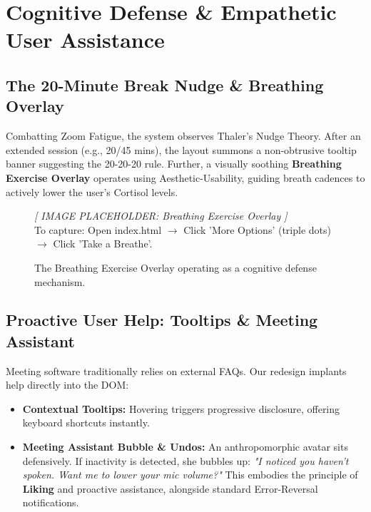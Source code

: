 \documentclass[12pt,a4paper]{article}
\begin{document}
\section{Cognitive Defense \& Empathetic User Assistance}

\subsection{The 20-Minute Break Nudge \& Breathing Overlay}
Combatting Zoom Fatigue, the system observes Thaler's Nudge Theory. After an extended session (e.g., 20/45 mins), the layout summons a non-obtrusive tooltip banner suggesting the 20-20-20 rule. Further, a visually soothing \textbf{Breathing Exercise Overlay} operates using Aesthetic-Usability, guiding breath cadences to actively lower the user's Cortisol levels.

\begin{figure}[H]
    \centering
    \begin{tcolorbox}[colback=gray!10,colframe=gray!50,arc=4mm,height=7cm,valign=center,halign=center]
        \large\textit{[ IMAGE PLACEHOLDER: Breathing Exercise Overlay ]}\\[0.5cm]
        \small To capture: Open index.html $\rightarrow$ Click 'More Options' (triple dots) $\rightarrow$ Click 'Take a Breathe'.
    \end{tcolorbox}
    \caption{The Breathing Exercise Overlay operating as a cognitive defense mechanism.}
\end{figure}

\subsection{Proactive User Help: Tooltips \& Meeting Assistant}
Meeting software traditionally relies on external FAQs. Our redesign implants help directly into the DOM:
\begin{itemize}
    \item \textbf{Contextual Tooltips:} Hovering triggers progressive disclosure, offering keyboard shortcuts instantly.
    \item \textbf{Meeting Assistant Bubble \& Undos:} An anthropomorphic avatar sits defensively. If inactivity is detected, she bubbles up: \textit{"I noticed you haven't spoken. Want me to lower your mic volume?"} This embodies the principle of \textbf{Liking} and proactive assistance, alongside standard Error-Reversal notifications.
\end{itemize}
\end{document}
